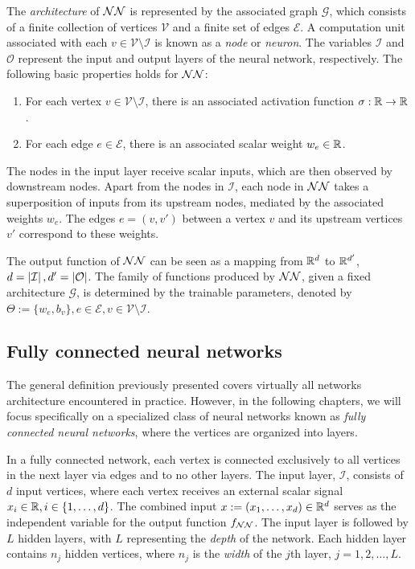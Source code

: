 The \textit{architecture} of $\mathcal{NN}$ is represented by the associated graph
$\mathcal{G}$, which consists of a finite collection of vertices $\mathcal{V}$
and a finite set of edges $\mathcal{E}$. A computation unit associated with each
$v \in \mathcal{V} \setminus \mathcal{I}$ is known as a \textit{node} or
\textit{neuron}. The variables $\mathcal{I}$ and $\mathcal{O}$ represent the
input and output layers of the neural network, respectively. The following basic
properties holds for $\mathcal{NN}$: 
\begin{enumerate}
    \item For each vertex $v \in \mathcal{V} \setminus \mathcal{I}$, there is an
    associated activation function $\sigma: \mathbb{R} \to \mathbb{R}$.
    \item For each edge $e \in \mathcal{E}$, there is an associated scalar
    weight $w_e \in \mathbb{R}$.
\end{enumerate}

The nodes in the input layer receive scalar inputs, which are then observed by
downstream nodes. Apart from the nodes in $\mathcal{I}$, each node in $\mathcal{NN}$
takes a superposition of inputs from its upstream nodes, mediated by the
associated weights $w_e$. The edges $e = (v, v')$ between a vertex $v$ and its
upstream vertices $v'$ correspond to these weights.

The output function of $\mathcal{NN}$ can be seen as a mapping from $\mathbb{R}^d$ to $\mathbb{R}^{d'}$,
$d = \left| \mathcal{I} \right|, d' = \left| \mathcal{O} \right|$. The family of functions
produced by $\mathcal{NN}$, given a fixed architecture $\mathcal{G}$, is determined by
the trainable parameters, denoted by $\Theta := \{w_e,b_v\}, e \in \mathcal{E}, v
\in \mathcal{V} \setminus \mathcal{I}$.

\subsection{Fully connected neural networks}

The general definition previously presented covers virtually all networks
architecture encountered in practice. However, in the following chapters, we
will focus specifically on a specialized class of neural networks known as
\textit{fully connected neural networks}, where the vertices are organized into
layers.

In a fully connected network, each vertex is connected exclusively to all
vertices in the next layer via edges and to no other layers.  The input layer,
$\mathcal{I}$, consists of $d$ input vertices, where each vertex receives an
external scalar signal $x_i \in \mathbb{R}, i \in \{1, \dots, d\}$. The combined input
$x := (x_1, \dots, x_d) \in \mathbb{R}^d$ serves as the independent variable for the
output function $f_{\mathcal{NN}}$. The input layer is followed by $L$ hidden layers,
with $L$ representing the \textit{depth} of the network. Each hidden layer
contains $n_j$ hidden vertices, where $n_j$ is the \textit{width} of the $j$th
layer, $j = 1, 2,\dots, L$.


